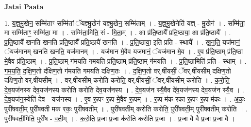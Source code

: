 \documentclass[17pt]{extarticle}
\begin{document}
\textbf{Jatai Paata} \newline

1. य॒ज्ञ्॒मु॒खेन॒ सम्मि॑ताꣳ॒॒ सम्मि॑तां ॅयज्ञ्मु॒खेन॑ यज्ञ्मु॒खेन॒ सम्मि॑ताम् । . य॒ज्ञ्॒मु॒खेनेति॑ यज्ञ् - मु॒खेन॑ । . सम्मि॑ता॒ मा सम्मि॑ताꣳ॒॒ सम्मि॑ता॒ मा । . सम्मि॑ता॒मिति॒ सं - मि॒ता॒म् । . आ प्र॑ति॒ष्ठायै᳚ प्रति॒ष्ठाया॒ आ प्र॑ति॒ष्ठायै᳚ । . प्र॒ति॒ष्ठायै॑ खनति खनति प्रति॒ष्ठायै᳚ प्रति॒ष्ठायै॑ खनति । . प्र॒ति॒ष्ठाया॒ इति॑ प्रति - स्थायै᳚ । . ख॒न॒ति॒ यज॑मानं॒ ॅयज॑मानम् खनति खनति॒ यज॑मानम् । . यज॑मान मे॒वैव यज॑मानं॒ ॅयज॑मान मे॒व । . ए॒व प्र॑ति॒ष्ठाम् प्र॑ति॒ष्ठा मे॒वैव प्र॑ति॒ष्ठाम् । . प्र॒ति॒ष्ठाम् ग॑मयति गमयति प्रति॒ष्ठाम् प्र॑ति॒ष्ठाम् ग॑मयति । . प्र॒ति॒ष्ठामिति॑ प्रति - स्थाम् । . ग॒म॒य॒ति॒ द॒क्षि॒ण॒तो द॑क्षिण॒तो ग॑मयति गमयति दक्षिण॒तः । . द॒क्षि॒ण॒तो वर्.षी॑यसीं॒ ॅवर्.षी॑यसीम् दक्षिण॒तो द॑क्षिण॒तो वर्.षी॑यसीम् । . वर्.षी॑यसीम् करोति करोति॒ वर्.षी॑यसीं॒ ॅवर्.षी॑यसीम् करोति । . क॒रो॒ति॒ दे॒व॒यज॑नस्य देव॒यज॑नस्य करोति करोति देव॒यज॑नस्य । . दे॒व॒यज॑न स्यै॒वैव दे॑व॒यज॑नस्य देव॒यज॑न स्यै॒व । . दे॒व॒यज॑न॒स्येति॑ देव - यज॑नस्य । . ए॒व रू॒पꣳ रू॒प मे॒वैव रू॒पम् । . रू॒प म॑क रका रू॒पꣳ रू॒प म॑कः । . अ॒कः॒ पुरी॑षवती॒म् पुरी॑षवती मक रकः॒ पुरी॑षवतीम् । . पुरी॑षवतीम् करोति करोति॒ पुरी॑षवती॒म् पुरी॑षवतीम् करोति । . पुरी॑षवती॒मिति॒ पुरी॑ष - व॒ती॒म् । . क॒रो॒ति॒ प्र॒जा प्र॒जा क॑रोति करोति प्र॒जा । . प्र॒जा वै वै प्र॒जा प्र॒जा वै । \newline
\end{document}
